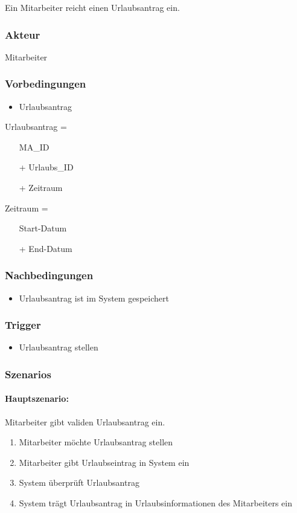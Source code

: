 Ein Mitarbeiter reicht einen Urlaubsantrag ein.

\subsubsection{Akteur}

Mitarbeiter

\subsubsection{Vorbedingungen}

\begin{itemize}
\item Urlaubsantrag
\end{itemize}

Urlaubsantrag =
\begin{itemize}
\item[] MA\_ID
\item[+] Urlaubs\_ID
\item[+] Zeitraum
\end{itemize}

Zeitraum = 
\begin{itemize}
\item[] Start-Datum
\item[+] End-Datum
\end{itemize}

\subsubsection{Nachbedingungen}
\begin{itemize}
\item Urlaubsantrag ist im System gespeichert
\end{itemize}

\subsubsection{Trigger}
\begin{itemize}
\item Urlaubsantrag stellen
\end{itemize}

\subsubsection{Szenarios}

\paragraph{Hauptszenario:} Mitarbeiter gibt validen Urlaubsantrag ein.
\begin{enumerate}
\item Mitarbeiter möchte Urlaubsantrag stellen
\item Mitarbeiter gibt Urlaubseintrag in System ein
\item System überprüft Urlaubsantrag
\item System trägt Urlaubsantrag in Urlaubsinformationen des Mitarbeiters ein
\end{enumerate}

